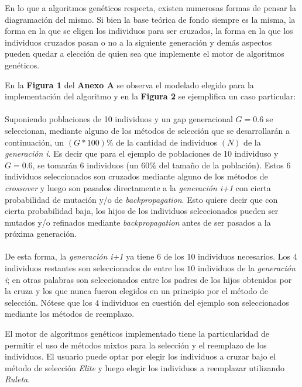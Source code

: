\documentclass[%
    final,
    reprint,
    notitlepage,
    narroweqnarray,
    inline,
    twoside,
    invited
    ]{ieee}
\begin{document}
\par En lo que a algoritmos genéticos respecta, existen numerosas formas de pensar la 
diagramación del mismo. Si bien la base teórica de fondo siempre es la misma, 
la forma en la que se eligen los individuos para ser cruzados, la forma en la que los individuos 
cruzados pasan o no a la siguiente generación y demás aspectos pueden quedar a elección de 
quien sea que implemente el motor de algoritmos genéticos.\\
\par En la \textbf{Figura 1} del \textbf {Anexo A} se observa el modelado elegido para la 
implementación del algoritmo y en la \textbf{Figura 2} se ejemplifica un caso particular: \\\\
Suponiendo poblaciones de 10 individuos 
y un gap generacional $G = 0.6$ se seleccionan, mediante alguno de los 
métodos de selección que se desarrollarán a continuación, un $(G*100)\%$ de la 
cantidad de individuos $(N)$ de la \textit{generación i}. Es decir que para el ejemplo de 
poblaciones de 10 individuso y $G = 0.6$, se tomarán $6$ individuos (un $60\%$ del tamaño de la población). 
Estos $6$ individuos seleccionados son cruzados 
mediante alguno de los métodos de \textit{crossover} y luego son pasados directamente 
a la \textit{generación i+1} con cierta probabilidad de mutación y/o de \textit{backpropagation}. 
Esto quiere decir que con cierta probabilidad baja, los hijos de los individuos seleccionados pueden 
ser mutados y/o refinados mediante \textit{backpropagation} antes de ser pasados a la próxima generación.\\\\
De esta forma, la \textit{generación i+1} ya tiene $6$ de los $10$ individuos necesarios. Los $4$ individuos restantes son seleccionados de entre los $10$ individuos de la \textit{generación i}; en otras palabras son seleccionados entre los padres de los hijos obtenidos por la cruza y los que nunca fueron elegidos en un principio por el método de selección. Nótese que los $4$ individuos en cuestión del ejemplo son seleccionados mediante los métodos de reemplazo.\\

\par El motor de algoritmos genéticos implementado tiene la particularidad de permitir el uso de métodos mixtos para la selección y el reemplazo de los individuos. El usuario puede optar por elegir los individuos a cruzar bajo el método de selección \textit{Elite} y luego elegir los individuos a reemplazar utilizando \textit{Ruleta}.
\end{document}
